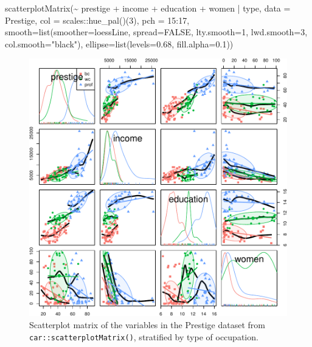 \documentclass[
  letterpaper,
  10pt,
  krantz2]{krantz}
\makeatletter
\newenvironment{Shaded}{\begin{snugshade}}{\end{snugshade}}
\newcommand{\AttributeTok}[1]{\textcolor[rgb]{0.40,0.45,0.13}{#1}}
\newcommand{\ConstantTok}[1]{\textcolor[rgb]{0.56,0.35,0.01}{#1}}
\newcommand{\DecValTok}[1]{\textcolor[rgb]{0.68,0.00,0.00}{#1}}
\newcommand{\FloatTok}[1]{\textcolor[rgb]{0.68,0.00,0.00}{#1}}
\newcommand{\FunctionTok}[1]{\textcolor[rgb]{0.28,0.35,0.67}{#1}}
\newcommand{\NormalTok}[1]{\textcolor[rgb]{0.00,0.23,0.31}{#1}}
\newcommand{\SpecialCharTok}[1]{\textcolor[rgb]{0.37,0.37,0.37}{#1}}
\newcommand{\StringTok}[1]{\textcolor[rgb]{0.13,0.47,0.30}{#1}}
\newenvironment{kframe}{%
  \medskip{}
  \setlength{\fboxsep}{.8em}
  \def\at@end@of@kframe{}%
  \ifinner\ifhmode%
  \def\at@end@of@kframe{\end{minipage}}%
  \begin{minipage}{\columnwidth}%
  \fi\fi%
  \def\FrameCommand##1{\hskip\@totalleftmargin \hskip-\fboxsep
  \colorbox{shadecolor}{##1}\hskip-\fboxsep
      \hskip-\linewidth \hskip-\@totalleftmargin \hskip\columnwidth}%
  \MakeFramed {\advance\hsize-\width
    \@totalleftmargin\z@ \linewidth\hsize
    \@setminipage}}%
{\par\unskip\endMakeFramed%
  \at@end@of@kframe}
\renewenvironment{Shaded}{\begin{kframe}}{\end{kframe}}
\makeatother
\begin{document}
\begin{Shaded}
\begin{Highlighting}[]
\FunctionTok{scatterplotMatrix}\NormalTok{(}\SpecialCharTok{\textasciitilde{}}\NormalTok{ prestige }\SpecialCharTok{+}\NormalTok{ income }\SpecialCharTok{+}\NormalTok{ education }\SpecialCharTok{+}\NormalTok{ women }\SpecialCharTok{|}\NormalTok{ type,}
  \AttributeTok{data =}\NormalTok{ Prestige,}
  \AttributeTok{col =}\NormalTok{ scales}\SpecialCharTok{::}\FunctionTok{hue\_pal}\NormalTok{()(}\DecValTok{3}\NormalTok{),}
  \AttributeTok{pch =} \DecValTok{15}\SpecialCharTok{:}\DecValTok{17}\NormalTok{,}
  \AttributeTok{smooth=}\FunctionTok{list}\NormalTok{(}\AttributeTok{smoother=}\NormalTok{loessLine, }\AttributeTok{spread=}\ConstantTok{FALSE}\NormalTok{,}
              \AttributeTok{lty.smooth=}\DecValTok{1}\NormalTok{, }\AttributeTok{lwd.smooth=}\DecValTok{3}\NormalTok{, }\AttributeTok{col.smooth=}\StringTok{"black"}\NormalTok{),}
  \AttributeTok{ellipse=}\FunctionTok{list}\NormalTok{(}\AttributeTok{levels=}\FloatTok{0.68}\NormalTok{, }\AttributeTok{fill.alpha=}\FloatTok{0.1}\NormalTok{))}
\end{Highlighting}
\end{Shaded}

\begin{figure}[H]

{\centering \includegraphics[width=1\textwidth,height=\textheight]{figs/ch03/fig-prestige-spm2-1.pdf}

}

\caption{\label{fig-prestige-spm2}Scatterplot matrix of the variables in
the Prestige dataset from \texttt{car::scatterplotMatrix()}, stratified
by type of occupation.}

\end{figure}
\end{document}
